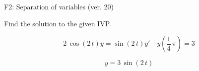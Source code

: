 \begin{exercise}
  \begin{exerciseTitle}F2: Separation of variables (ver. 20)\end{exerciseTitle}
  \begin{exerciseStatement}
    
Find the solution to the given IVP.

    
\[2 \, \cos\left(2 \, t\right) y= \sin\left(2 \, t\right) y'\hspace{1em} y\left( \frac{1}{4} \, \pi \right)= 3\]

  \end{exerciseStatement}
  \begin{exerciseAnswer}
    
\[y= 3 \, \sin\left(2 \, t\right)\]

  \end{exerciseAnswer}
\end{exercise}